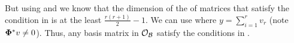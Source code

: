 
     
     
     But using  and  we know that the dimension of the  of matrices that satisfy the condition in  is at the least $\frac{r(r+1)}{2} -1$. We can use  where $y = \sum_{i = 1}^r v_r$ (note $\boldsymbol{\Phi}^*v \neq 0$). Thus, any basis matrix in $\mathcal{O}_{{\mathcal{B}}}$ satisfy the conditions in .


    
    
